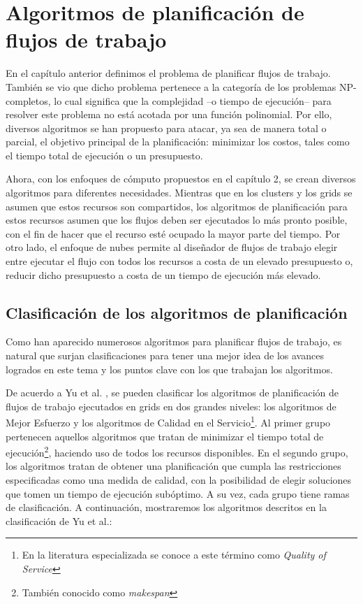 \chapter[Planificación de flujos de trabajo]{Algoritmos de planificación de flujos de trabajo}
\label{chap:scheduling_algorithms}

En el capítulo anterior definimos el problema de planificar flujos de trabajo. También se vio que dicho problema pertenece a la categoría de los problemas NP-completos, lo cual significa que la complejidad --o tiempo de ejecución-- para resolver este problema no está acotada por una función polinomial. Por ello, diversos algoritmos se han propuesto para atacar, ya sea de manera total o parcial, el objetivo principal de la planificación: minimizar los costos, tales como el tiempo total de ejecución o un presupuesto.

Ahora, con los enfoques de cómputo propuestos en el capítulo 2, se crean diversos algoritmos para diferentes necesidades. Mientras que en los clusters y los grids se asumen que estos recursos son compartidos, los algoritmos de planificación para estos recursos asumen que los flujos deben ser ejecutados lo más pronto posible, con el fin de hacer que el recurso esté ocupado la mayor parte del tiempo. Por otro lado, el enfoque de nubes permite al diseñador de flujos de trabajo elegir entre ejecutar el flujo con todos los recursos a costa de un elevado presupuesto o, reducir dicho presupuesto a costa de un tiempo de ejecución más elevado.

\section{Clasificación de los algoritmos de planificación}
Como han aparecido numerosos algoritmos para planificar flujos de trabajo, es natural que surjan clasificaciones \cite{topcuoglu2002performance} \cite{yu2008workflow} para tener una mejor idea de los avances logrados en este tema y los puntos clave con los que trabajan los algoritmos.

De acuerdo a Yu et al. \cite{yu2008workflow}, se pueden clasificar los algoritmos de planificación de flujos de trabajo ejecutados en grids en dos grandes niveles: los algoritmos de Mejor Esfuerzo y los algoritmos de Calidad en el Servicio\footnote{En la literatura especializada se conoce a este término como \emph{Quality of Service}}. Al primer grupo pertenecen aquellos algoritmos que tratan de minimizar el tiempo total de ejecución\footnote{También conocido como \emph{makespan}}, haciendo uso de todos los recursos disponibles. En el segundo grupo, los algoritmos tratan de obtener una planificación que cumpla las restricciones especificadas como una medida de calidad, con la posibilidad de elegir soluciones que tomen un tiempo de ejecución subóptimo. A su vez, cada grupo tiene ramas de clasificación. A continuación, mostraremos los algoritmos descritos en la clasificación de Yu et al.: %

